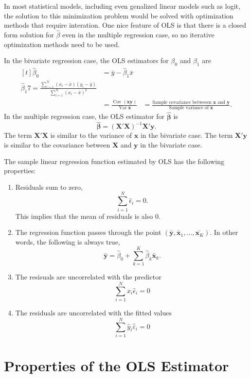 \documentclass[]{book}
\providecommand{\tightlist}{%
  \setlength{\itemsep}{0pt}\setlength{\parskip}{0pt}}
\DeclareMathOperator{\Var}{Var}
\DeclareMathOperator{\Cov}{Cov}
\newcommand{\mat}[1]{\boldsymbol{#1}}
\renewcommand{\vec}[1]{\boldsymbol{#1}}
\begin{document}
In most statistical models, including even genalized linear models such
as logit, the solution to this minimization problem would be solved with
optimization methods that require interation. One nice feature of OLS is
that there is a closed form solution for \(\hat{\beta}\) even in the
multiple regression case, so no iterative optimization methods need to
be used.

In the bivariate regression case, the OLS estimators for \(\beta_0\) and
\(\beta_1\) are \[
\begin{aligned}[t]
\hat{\beta}_0 &= \bar{y} - \hat\beta_1 \bar{x} \\
\hat{\beta}_1 7= \frac{\sum_{i = 1}^N (x_i - \bar{x}) (y_i - \bar{y})}{\sum_{i = 1}^N (x_i - \bar{x})^2} \\
&= \frac{\Cov(\vec{x} \vec{y})}{\Var{\vec{x}}}
&= \frac{\text{Sample covariance betweeen $\vec{x}$ and $\vec{y}$}}{\text{Sample variance of $\vec{x}$}} .
\end{aligned}
\] In the multiple regression case, the OLS estimator for
\(\hat{\vec{\beta}}\) is \[
\hat{\vec{\beta}} = \left( \mat{X}' \mat{X} \right)^{-1} \mat{X}' \vec{y} .
\] The term \(\mat{X}' \mat{X}\) is similar to the variance of
\(\vec{x}\) in the bivariate case. The term \(\mat{X}' \vec{y}\) is
similar to the covariance between \(\mat{X}\) and \(\vec{y}\) in the
bivariate case.

The sample linear regression function estimated by OLS has the following
properties:

\begin{enumerate}
\def\labelenumi{\arabic{enumi}.}
\tightlist
\item
  Residuals sum to zero, \[
  \sum_{i = 1}^N \hat{\epsilon}_i = 0 .
  \] This implies that the mean of residuals is also 0.
\item
  The regression function passes through the point
  \((\bar{\vec{y}}, \bar{\vec{x}}_1, \dots, \bar{\vec{x}_K})\). In other
  words, the following is always true, \[
  \bar{\vec{y}} = \hat\beta_0 + \sum_{k = 1}^K \hat\beta_k \bar{\vec{x}}_k .
  \]
\item
  The resisuals are uncorrelated with the predictor \[
  \sum_{i = 1}^N x_i \hat{\epsilon}_i = 0
  \]
\item
  The residuals are uncorrelated with the fitted values \[
  \sum_{i = 1}^N \hat{y}_i \hat{\varepsilon}_i = 0
  \]
\end{enumerate}

\section{Properties of the OLS
Estimator}\label{properties-of-the-ols-estimator}
\end{document}
